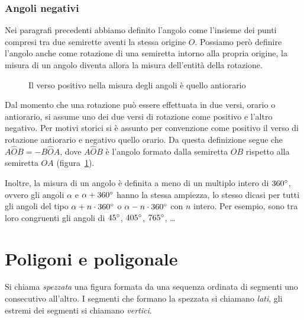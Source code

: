 \subsubsection{Angoli negativi}

Nei paragrafi precedenti abbiamo definito l'angolo come l'insieme dei punti compresi tra due semirette aventi la stessa origine $O$. Possiamo però definire l'angolo anche come rotazione di una semiretta intorno alla propria origine, la misura di un angolo diventa allora la misura dell'entità della rotazione.

\begin{figure}[!htb]
	\centering
	\caption{Il verso positivo nella misura degli angoli è quello antiorario}\label{fig:1.43}
\end{figure}

Dal momento che una rotazione può essere effettuata in due versi, orario o antiorario, si assume uno dei due versi di rotazione come positivo e l'altro negativo. Per motivi storici si è assunto per convenzione come positivo il verso di rotazione antiorario e negativo quello orario.
Da questa definizione segue che $A\widehat{O}B = -B\widehat{O}A$, dove $A\widehat{O}B$ è l'angolo formato dalla semiretta $OB$ rispetto alla semiretta $OA$ (figura~\ref{fig:1.43}).

Inoltre, la misura di un angolo è definita a meno di un multiplo intero di $360{}^{\circ}$, ovvero gli angoli $\alpha$ e $\alpha+360{}^{\circ}$ hanno la stessa ampiezza, lo stesso dicasi per tutti gli angoli del tipo $\alpha+n\cdot 360{}^{\circ}$ o $\alpha - n\cdot 360{}^{\circ}$ con $n$ intero. Per esempio, sono tra loro congruenti gli angoli di $45{}^{\circ}$, $405{}^{\circ}$, $765{}^{\circ}$, \ldots{}

\vspazio\ovalbox{\risolvii \ref{ese:1.104}, \ref{ese:1.105}, \ref{ese:1.106}, \ref{ese:1.107}, \ref{ese:1.108}, \ref{ese:1.109}, \ref{ese:1.110}, \ref{ese:1.111}, \ref{ese:1.112}, \ref{ese:1.113}, \ref{ese:1.114},}

\ovalbox{\ref{ese:1.115}, \ref{ese:1.116}, \ref{ese:1.117}, \ref{ese:1.118}, \ref{ese:1.119}, \ref{ese:1.120}, \ref{ese:1.121}, \ref{ese:1.122}, \ref{ese:1.123}, \ref{ese:1.124}}


\section{Poligoni e poligonale}\label{sect:poligoni}

\begin{definizione}
Si chiama \emph{spezzata} una figura formata da una sequenza ordinata di segmenti uno consecutivo all'altro. I segmenti che formano la spezzata si chiamano \emph{lati}, gli estremi dei segmenti si chiamano \emph{vertici}.
\end{definizione}

